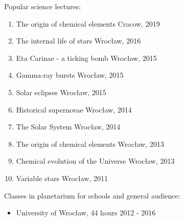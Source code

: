 \documentclass[margin, 10pt]{res} %
\begin{document}
\begin{resume}
Popular science lectures: \\
\begin{enumerate}[noitemsep]
    \item The origin of chemical elements \hfill Cracow, 2019 \\
    \item The internal life of stars \hfill  Wroc\l{}aw, 2016 \\
    \item Eta Carinae - a ticking bomb \hfill Wroc\l{}aw, 2015 \\
    \item Gamma-ray bursts \hfill Wroc\l{}aw, 2015 \\
    \item Solar eclipses \hfill Wroc\l{}aw, 2015 \\
    \item Historical supernovae \hfill Wroc\l{}aw, 2014 \\
    \item The Solar System \hfill Wroc\l{}aw, 2014 \\
    \item The origin of chemical elements \hfill Wroc\l{}aw, 2013 \\
    \item Chemical evolution of the Universe \hfill Wroc\l{}aw, 2013 \\
    \item Variable stars \hfill Wroc\l{}aw, 2011
\end{enumerate}

Classes in planetarium for schools and general audience: \\
\begin{itemize}[noitemsep]
    \item University of Wroc\l{}aw, 44 hours \hfill 2012 - 2016
\end{itemize}


\end{resume}

\end{document}
